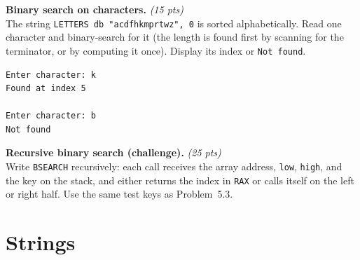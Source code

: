 \documentclass[11pt,letterpaper]{article}
\newcommand{\pts}[1]{\hfill\textit{(#1 pts)}}
\newcommand{\ttl}[1]{\textbf{#1.}}
\begin{document}
\begin{problems}
\item \ttl{Binary search on characters} \pts{15}
\\The string \texttt{LETTERS db "acdfhkmprtwz", 0} is sorted alphabetically. Read one character and binary-search for it (the length is found first by scanning for the terminator, or by computing it once). Display its index or \texttt{Not found}.
\begin{lstlisting}[style=out]
Enter character: k
Found at index 5

Enter character: b
Not found
\end{lstlisting}

\item \ttl{Recursive binary search (challenge)} \pts{25}
\\Write \texttt{BSEARCH} recursively: each call receives the array address, \texttt{low}, \texttt{high}, and the key on the stack, and either returns the index in \texttt{RAX} or calls itself on the left or right half. Use the same test keys as Problem~5.3.

\end{problems}

\section{Strings}
\end{document}
